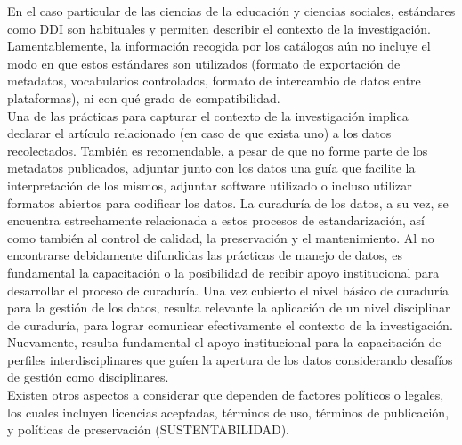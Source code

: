 \documentclass[runningheads]{llncs}
\begin{document}
En el caso particular de las ciencias de la educación y ciencias sociales, estándares como DDI son habituales y permiten describir el contexto de la investigación. Lamentablemente, la información recogida por los catálogos aún no incluye el modo en que estos estándares son utilizados (formato de exportación de metadatos, vocabularios controlados, formato de intercambio de datos entre plataformas), ni con qué grado de compatibilidad.\\

Una de las prácticas para capturar el contexto de la investigación implica declarar el artículo relacionado (en caso de que exista uno) a los datos recolectados. También es recomendable, a pesar de que no forme parte de los metadatos publicados, adjuntar junto con los datos una guía que facilite la interpretación de los mismos, adjuntar software utilizado o incluso utilizar formatos abiertos para codificar los datos. La curaduría de los datos, a su vez, se encuentra estrechamente relacionada a estos procesos de estandarización, así como también al control de calidad, la preservación y el mantenimiento. Al no encontrarse debidamente difundidas las prácticas de manejo de datos, es fundamental la capacitación o la posibilidad de recibir apoyo institucional para desarrollar el proceso de curaduría. Una vez cubierto el nivel básico de curaduría para la gestión de los datos, resulta relevante la aplicación de un nivel disciplinar de curaduría,  para lograr comunicar efectivamente el contexto de la investigación. Nuevamente, resulta fundamental el apoyo institucional para la capacitación de perfiles interdisciplinares que guíen la apertura de los datos considerando desafíos de gestión como disciplinares.\\


Existen otros aspectos a considerar que dependen de factores políticos o legales, los cuales incluyen licencias aceptadas, términos de uso, términos de publicación,  y políticas de preservación (SUSTENTABILIDAD). 
\end{document}

